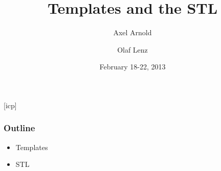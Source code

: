 \documentclass{slides}
\begin{document}
\graphicspath{{figures/}}

\title[Templates and the STL]{\Large Templates and the STL}

\author[A. Arnold and O. Lenz]{Axel Arnold \and Olaf Lenz} 
\date{February 18-22, 2013}

\begin{frame}
  \titlepage
\end {frame}
[icp]

\begin{frame}
  \frametitle{Outline}
  \begin{itemize}
  \item Templates
  \item STL
  \end{itemize}
\end{frame}
\end{document}
